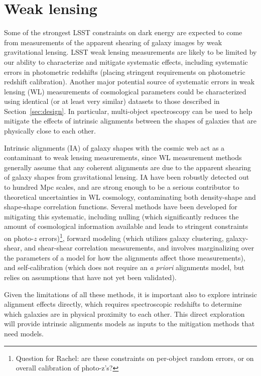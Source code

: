 \section{Weak lensing}
\label{sec:wl}

Some of the strongest LSST constraints on dark energy are expected to come from measurements of the apparent shearing of galaxy images by weak gravitational lensing.  LSST weak lensing measurements are likely to be limited by our ability to characterize and mitigate systematic effects, including systematic errors in photometric redshifts (placing stringent requirements on photometric redshift calibration).  Another major potential source of systematic errors in weak lensing (WL) measurements of cosmological parameters could be characterized using identical (or at least very similar) datasets to those described in Section~\ref{sec:design}.  In particular, multi-object spectroscopy can be
used to help mitigate the effects of intrinsic alignments between the shapes of galaxies that are physically close to each other.

Intrinsic alignments (IA) of galaxy shapes with the cosmic web act as a contaminant to weak lensing
measurements, since WL measurement methods generally assume that any coherent alignments are due to the apparent shearing of galaxy shapes from gravitational lensing. IA have
been robustly detected out to hundred Mpc scales, and are strong enough to be a serious contributor to theoretical uncertainties in WL cosmology, contaminating both density-shape and shape-shape correlation functions.  Several
methods have been developed for mitigating this systematic, including nulling (which significantly reduces the amount of
cosmological information available and leads to stringent constraints on photo-$z$ errors)\footnote{Question for Rachel: are these constraints on per-object random errors, or on overall calibration of photo-z's?}, forward modeling
(which utilizes galaxy clustering, galaxy-shear, and shear-shear correlation measurements, and involves
marginalizing over the parameters of a model for how the alignments affect those measurements), and self-calibration
(which does not require an {\em a priori} alignments model, but relies on assumptions that have
not yet been validated).  

Given the limitations of all these methods, it is important also to
explore intrinsic alignment effects directly, which requires spectroscopic redshifts to determine
which galaxies are in physical proximity to each other.  This direct exploration will provide
intrinsic alignments models as inputs to the mitigation methods that need models.  %

